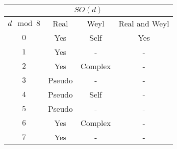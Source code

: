 \begin{tabular}{|cccc|}
    \hline
    \multicolumn{4}{|c|}{$SO(d)$}                                                                                 \\ \hline
    \multicolumn{1}{|c|}{$d \mod 8$} & \multicolumn{1}{c|}{Real}   & \multicolumn{1}{c|}{Weyl}    & Real and Weyl \\ \hline
    \multicolumn{1}{|c|}{$0$}        & \multicolumn{1}{c|}{Yes}    & \multicolumn{1}{c|}{Self}    & Yes           \\ \hline
    \multicolumn{1}{|c|}{$1$}        & \multicolumn{1}{c|}{Yes}    & \multicolumn{1}{c|}{-}       & -             \\ \hline
    \multicolumn{1}{|c|}{$2$}        & \multicolumn{1}{c|}{Yes}    & \multicolumn{1}{c|}{Complex} & -             \\ \hline
    \multicolumn{1}{|c|}{$3$}        & \multicolumn{1}{c|}{Pseudo} & \multicolumn{1}{c|}{-}       & -             \\ \hline
    \multicolumn{1}{|c|}{$4$}        & \multicolumn{1}{c|}{Pseudo} & \multicolumn{1}{c|}{Self}    & -             \\ \hline
    \multicolumn{1}{|c|}{$5$}        & \multicolumn{1}{c|}{Pseudo} & \multicolumn{1}{c|}{-}       & -             \\ \hline
    \multicolumn{1}{|c|}{$6$}        & \multicolumn{1}{c|}{Yes}    & \multicolumn{1}{c|}{Complex} & -             \\ \hline
    \multicolumn{1}{|c|}{$7$}        & \multicolumn{1}{c|}{Yes}    & \multicolumn{1}{c|}{-}       & -             \\ \hline
    \end{tabular}